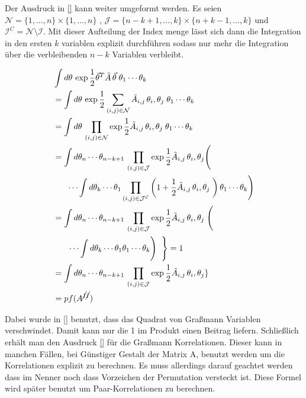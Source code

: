 \noindent Der Ausdruck in \eqref{} kann weiter umgeformt werden. Es seien $\mathcal{N} = \{1,\dots,n\} \times \{1,\dots,n\}$ , $\mathcal{J} = \{n-k+1,\dots,k\} \times \{n+k-1,\dots,k\}$ und $\mathcal{I}^C = \mathcal{N} \setminus \mathcal{I} $. Mit dieser Aufteilung der Index menge lässt sich dann die Integration in den ersten $k$ variablen explizit durchführen sodass nur mehr die Integration über die verbleibenden $n-k$ Variablen verbleibt.

\begin{align}
    &\int d\theta\, \exp{ \frac{1}{2} \vec{\theta}^T \tilde A\, \vec{\theta}\;}  \theta_{1}\cdots\theta_k \nonumber\\
    &= \int d\theta\, \exp{ \frac{1}{2}\sum_{(i,j) \in \mathcal{N}} \tilde A_{i,j}\, \theta_i, \theta_j\;}  \theta_{1}\cdots\theta_k \nonumber\\
    &= \int d\theta\, \prod_{(i,j) \in \mathcal{N}} \exp{ \frac{1}{2} \tilde A_{i,j}\, \theta_i, \theta_j\;}  \theta_{1}\cdots\theta_k \nonumber \\
    &=  \int d\theta_n \cdots \theta_{n-k+1} \, \prod_{(i,j) \in \mathcal{J}} \exp{ \frac{1}{2} \tilde A_{i,j}\, \theta_i, \theta_j} \Bigg( \nonumber\\
    & \;\;\;\;\;\; \cdots \int d\theta_k \cdots \theta_{1}  \prod_{(i,j) \in \mathcal{J^C}} \left( 1 + \frac{1}{2} \tilde A_{i,j}\, \theta_i, \theta_j\;\right) \theta_{1}\cdots\theta_k \Bigg) \nonumber \\
    &=  \int d\theta_n \cdots \theta_{n-k+1} \, \prod_{(i,j) \in \mathcal{J}} \exp{ \frac{1}{2} \tilde A_{i,j}\, \theta_i, \theta_j\;} \Bigg( \\
    & \left. \;\;\;\;\;\; \cdots \int d\theta_k \cdots \theta_{1} \theta_{1}\cdots\theta_k \Bigg)   \;\;\right\}  = 1 \nonumber\\
    &=  \int d\theta_n \cdots \theta_{n-k+1} \, \prod_{(i,j) \in \mathcal{J}} \exp{ \frac{1}{2} \tilde A_{i,j}\, \theta_i, \theta_j\}} \nonumber \\
    &= pf(A^{\cancel{I} \cancel{I}}) 
\end{align}

\noindent Dabei wurde in \eqref{} benutzt, dass das Quadrat von Graßmann Variablen verschwindet. Damit kann nur die 1 im Produkt einen Beitrag liefern. Schließlich erhält man den Ausdruck
\eqref{} für die Graßmann Korrelationen. Dieser kann in manchen Fällen, bei Günstiger Gestalt der Matrix A, benutzt werden um die Korrelationen explizit zu berechnen. Es muss allerdings darauf geachtet werden dass im Nenner noch dass Vorzeichen der Permutation versteckt ist. Diese Formel wird später benutzt um Paar-Korrelationen zu berechnen. 

